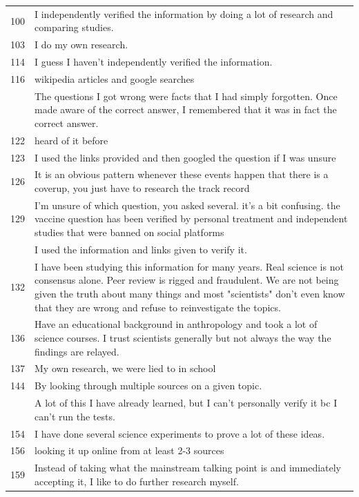 \documentclass[
  doc,floatsintext]{apa6}
\begin{document}
\begin{longtable}[t]{>{}r>{\raggedright\arraybackslash}p{30em}}
100 & I independently verified the information by doing a lot of research and comparing studies.\\
103 & I do my own research.\\
114 & I guess I haven't independently verified the information.\\
116 & wikipedia articles and google searches\\
\addlinespace
120 & The questions I got wrong were facts that I had simply forgotten. Once made aware of the correct answer, I remembered that it was in fact the correct answer.\\
122 & heard of it before\\
123 & I used the links provided and then googled the question if I was unsure\\
126 & It is an obvious pattern whenever these events happen that there is a coverup, you just have to research the track record\\
129 & I'm unsure of which question, you asked several.  it's a bit confusing. the vaccine question has been verified by personal treatment and independent studies that were banned on social platforms\\
\addlinespace
131 & I used the information and links given to verify it.\\
132 & I have been studying this information for many years. Real science is not consensus alone. Peer review is rigged and fraudulent. We are not being given the truth about many things and most "scientists" don't even know that they are wrong and refuse to reinvestigate the topics.\\
136 & Have an educational background in anthropology and took a lot of science courses. I trust scientists generally but not always the way the findings are relayed.\\
137 & My own research, we were lied to in school\\
144 & By looking through multiple sources on a given topic.\\
\addlinespace
152 & A lot of this I have already learned, but I can't personally verify it bc I can't run the tests.\\
154 & I have done several science experiments to prove a lot of these ideas.\\
156 & looking it up online from at least 2-3 sources\\
159 & Instead of taking what the mainstream talking point is and immediately accepting it, I like to do further research myself.\\

\end{longtable}
\end{document}
